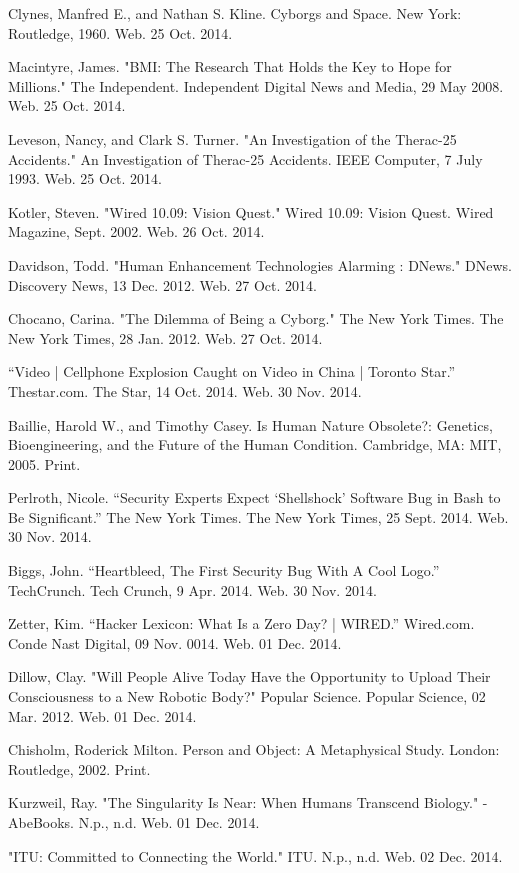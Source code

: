 \documentclass[12pt,a4paper,notitlepage]{article}
\begin{document}
\newpage
\begin{thebibliography}{9}

 Clynes, Manfred E., and Nathan S. Kline. Cyborgs and Space. New
	York: Routledge, 1960. Web. 25 Oct. 2014.

 Macintyre, James. "BMI: The Research That Holds the Key to
	Hope for Millions." The Independent. Independent Digital News and Media, 29
	May 2008. Web. 25 Oct. 2014.

 Leveson, Nancy, and Clark S. Turner. "An Investigation of the
	Therac-25 Accidents." An Investigation of Therac-25 Accidents. IEEE
	Computer, 7 July 1993. Web. 25 Oct. 2014.

 Kotler, Steven. "Wired 10.09: Vision Quest." Wired 10.09: Vision
	Quest. Wired Magazine, Sept. 2002. Web. 26 Oct. 2014.

 Davidson, Todd. "Human Enhancement Technologies Alarming :
	DNews." DNews. Discovery News, 13 Dec. 2012. Web. 27 Oct. 2014.

 Chocano, Carina. "The Dilemma of Being a Cyborg." The New York
	Times. The New York Times, 28 Jan. 2012. Web. 27 Oct. 2014.

 ``Video | Cellphone Explosion Caught on Video in
	China | Toronto Star.'' Thestar.com. The Star, 14 Oct. 2014. Web. 30 Nov.
	2014.

 Baillie, Harold W., and Timothy Casey. Is Human Nature
	Obsolete?: Genetics, Bioengineering, and the Future of the Human Condition.
	Cambridge, MA: MIT, 2005.  Print.

 Perlroth, Nicole. ``Security Experts Expect ‘Shellshock’
	Software Bug in Bash to Be Significant.'' The New York Times. The New York
	Times, 25 Sept. 2014. Web. 30 Nov. 2014.

 Biggs, John. ``Heartbleed, The First Security Bug With A
	Cool Logo.'' TechCrunch. Tech Crunch, 9 Apr. 2014. Web. 30 Nov. 2014.

Zetter, Kim. ``Hacker Lexicon: What Is a Zero Day? | WIRED.''
	Wired.com. Conde Nast Digital, 09 Nov. 0014. Web. 01 Dec. 2014.

Dillow, Clay. "Will People Alive Today Have the Opportunity to
	Upload Their Consciousness to a New Robotic Body?" Popular Science. Popular
	Science, 02 Mar. 2012. Web. 01 Dec. 2014.

Chisholm, Roderick Milton. Person and Object: A Metaphysical
	Study. London: Routledge, 2002. Print.

Kurzweil, Ray. "The Singularity Is Near: When Humans Transcend
	Biology." - AbeBooks. N.p., n.d. Web. 01 Dec. 2014.

"ITU: Committed to Connecting the World." ITU. N.p., n.d. Web. 02
	Dec. 2014.

\end{thebibliography}
\end{document}
